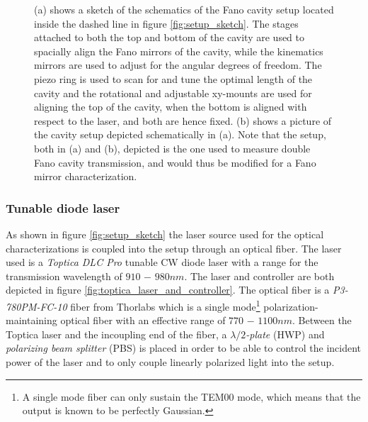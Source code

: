 \begin{figure}[h!]
\begin{subfigure}[b]{0.25\textwidth}
        \caption{}
        \label{fig:cavity_setup_picture}
    \end{subfigure}
    \caption{(a) shows a sketch of the schematics of the Fano cavity setup located inside the dashed line in figure \ref{fig:setup_sketch}. The stages attached to both the top and bottom of the cavity are used to spacially align the Fano mirrors of the cavity, while the kinematics mirrors are used to adjust for the angular degrees of freedom. The piezo ring is used to scan for and tune the optimal length of the cavity and the rotational and adjustable xy-mounts are used for aligning the top of the cavity, when the bottom is aligned with respect to the laser, and both are hence fixed. (b) shows a picture of the cavity setup depicted schematically in (a). Note that the setup, both in (a) and (b), depicted is the one used to measure double Fano cavity transmission, and would thus be modified for a Fano mirror characterization.}
    \label{fig:cavity_setup}
\end{figure}

\subsubsection{Tunable diode laser}

As shown in figure \ref{fig:setup_sketch} the laser source used for the optical characterizations is coupled into the setup through an optical fiber. The laser used is a \emph{Toptica DLC Pro} tunable CW diode laser with a range for the transmission wavelength of $910$ $-$ $980nm$. The laser and controller are both depicted in figure \ref{fig:toptica_laser_and_controller}. The optical fiber is a \emph{P3-780PM-FC-10} fiber from Thorlabs which is a single mode\footnote{A single mode fiber can only sustain the TEM00 mode, which means that the output is known to be perfectly Gaussian.} polarization-maintaining optical fiber with an effective range of $770$ $-$ $1100nm$. Between the Toptica laser and the incoupling end of the fiber, a $\lambda/2$\emph{-plate} (HWP) and \emph{polarizing beam splitter} (PBS) is placed in order to be able to control the incident power of the laser and to only couple linearly polarized light into the setup.  

